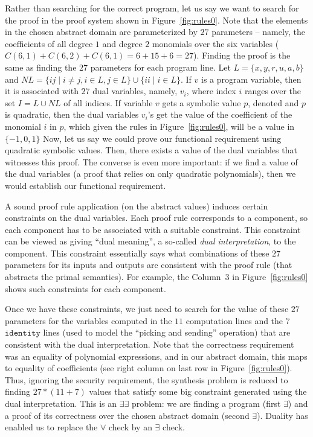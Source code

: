 \documentclass[preprint]{sig-alternate-05-2015}
\begin{document}
Rather than searching for the correct program, let us say we want to
search for the proof in the proof system shown in Figure~\ref{fig:rules0}.  
Note that the
elements in the chosen abstract domain are parameterized
by $27$ parameters -- namely, the coefficients of all degree $1$ and degree $2$
monomials over the six variables ($C(6,1) + C(6,2) + C(6,1) = 6 + 15 + 6 = 27$).
Finding the proof is the same as finding the $27$ parameters for each program
line.
Let $L = \{x,y,r,u,a,b\}$ and $NL = \{ij \mid i\neq j, i\in L, j\in L\}\cup \{ii \mid i\in L\}$.
If $v$ is a program variable, then it is associated with
$27$ dual  variables, namely, $v_i$, where index $i$ ranges over the set
$I = L\cup NL$ of all indices. If variable $v$ gets a symbolic value
$p$, denoted  and $p$ is quadratic, then
the dual variables $v_i$'s get the value of the coefficient of the
monomial $i$ in $p$, which given the rules in Figure~\ref{fig:rules0},
will be a value in $\{-1, 0, 1\}$  
Now, let us say we could prove our functional requirement using quadratic
symbolic values.  Then, there exists a value of the dual variables that
witnesses this proof.  The converse is even more important: if
we find a value of the dual variables (a proof that relies on only
quadratic polynomials), then we would establish our functional requirement.

A sound proof rule application (on the abstract values) 
induces certain constraints on the dual variables.
Each proof rule corresponds to a component, so 
each component has to be associated with a suitable
constraint.  This constraint can be viewed as giving
``dual meaning'', a so-called {\em{dual interpretation}},
to the component.  This constraint essentially
says what combinations of these $27$
parameters for its inputs and outputs are consistent with the 
proof rule (that abstracts the primal semantics).
For example, the Column~$3$ in Figure~\ref{fig:rules0} shows
such constraints for each component.

Once we have these constraints, we just need to
search for the value of these $27$ parameters for the 
variables computed in the 
$11$ computation lines and the $7$ $\mathtt{identity}$ lines (used to model
the ``picking and sending'' operation) that are consistent with the
dual interpretation.
Note that the correctness 
requirement was an equality of polynomial expressions, and in our
abstract domain, this maps to equality of coefficients 
(see right column on last row in Figure~\ref{fig:rules0}).
Thus, ignoring the security requirement, 
the synthesis problem is reduced to finding
$27*(11+7)$ values that satisfy some big constraint generated 
using the dual interpretation.  This is an $\exists\exists$ problem:
we are finding a program (first $\exists$) and a proof of its correctness over
the chosen abstract domain (second $\exists$).
Duality has enabled us to replace the $\forall$ check by an 
$\exists$ check.
\end{document}
